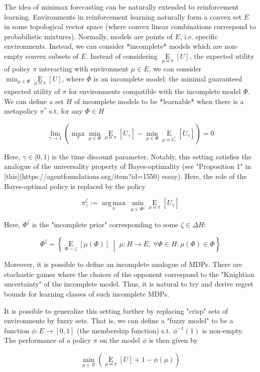\documentclass[a4paper]{article}
\newcommand{\AP}[1]{\left(#1\right)}
\newcommand{\AB}[1]{\left[#1\right]}
\newcommand{\ACM}[2]{\left\{#1\;\middle\vert\;#2\right\}}
\newcommand{\Ea}[2]{\underset{#1}{\operatorname{E}}\AB{#2}}
\newcommand{\Argmax}[1]{\underset{#1}{\operatorname{arg\,max}}\,}
\begin{document}
The idea of minimax forecasting can be naturally extended to reinforcement learning. Environments in reinforcement learning naturally form a convex set $E$ in some topological vector space (where convex linear combinations correspond to probabilistic mixtures). Normally, models are points of $E$, i.e. specific environments. Instead, we can consider *incomplete* models which are non-empty convex subsets of $E$. Instead of considering $\Ea{\mu\bowtie\pi}{U}$, the expected utility of policy $\pi$ interacting with environment $\mu \in E$, we can consider $\min_{\mu\in\Phi}{\Ea{\mu\bowtie\pi}{U}}$, where $\Phi$ is an incomplete model: the minimal guaranteed expected utility of $\pi$ for environments compatible with the incomplete model $\Phi$. We can define a set $H$ of incomplete models to be *learnable* when there is a metapolicy $\pi^*$ s.t. for any $\Phi \in H$

$$\lim_{\gamma \rightarrow 1} \AP{\max_{\pi} \min_{\mu\in\Phi}{\Ea{\mu\bowtie\pi}{U_\gamma}}-\min_{\mu\in\Phi}{\Ea{\mu\bowtie\pi_\gamma^*}{U_\gamma}}} = 0$$

Here, $\gamma\in[0,1)$ is the time discount parameter. Notably, this setting satisfies the analogue of the universality property of Bayes-optimality (see "Proposition 1" in [this](https://agentfoundations.org/item?id=1550) essay). Here, the role of the Bayes-optimal policy is replaced by the policy

$$\pi_\gamma^\zeta := \Argmax{\pi}{\min_{\mu\in\Phi^\zeta}{\Ea{\mu\bowtie\pi}{U_\gamma}}}$$

Here, $\Phi^\zeta$ is the "incomplete prior" corresponding to some $\zeta\in\Delta H$:

$$\Phi^\zeta = \ACM{\Ea{\Phi\sim\zeta}{\mu(\Phi)}}{\mu: H \rightarrow E,\ \forall\Phi \in H: \mu(\Phi) \in \Phi}$$

Moreover, it is possible to define an incomplete analogue of MDPs. There are stochastic games where the choices of the opponent correspond to the "Knightian uncertainty" of the incomplete model. Thus, it is natural to try and derive regret bounds for learning classes of such incomplete MDPs.

It is possible to generalize this setting further by replacing "crisp" sets of environments by fuzzy sets. That is, we can define a "fuzzy model" to be a function $\phi: E \rightarrow [0,1]$ (the membership function) s.t. $\phi^{-1}(1)$ is non-empty. The performance of a policy $\pi$ on the model $\phi$ is then given by

$$\min_{\mu \in E}\AP{{\Ea{\mu\bowtie\pi}{U}}+1-\phi(\mu)}$$
\end{document}
